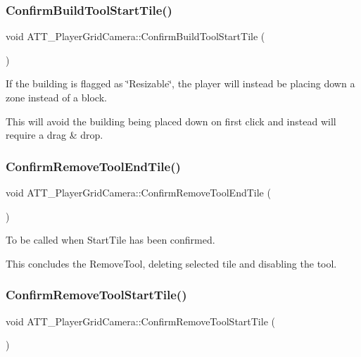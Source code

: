 \subsubsection{\texorpdfstring{ConfirmBuildToolStartTile()}{ConfirmBuildToolStartTile()}}
{\footnotesize\ttfamily void A\+T\+T\+\_\+\+Player\+Grid\+Camera\+::\+Confirm\+Build\+Tool\+Start\+Tile (\begin{DoxyParamCaption}{ }\end{DoxyParamCaption})\hspace{0.3cm}{\ttfamily [protected]}}



If the building is flagged as \char`\"{}\+Resizable\char`\"{}, the player will instead be placing down a zone instead of a block. 

This will avoid the building being placed down on first click and instead will require a drag \& drop. \mbox{\label{class_a_t_t___player_grid_camera_a26a23b23a58d5bbeab3359dcbd359b3a}} 
\subsubsection{\texorpdfstring{ConfirmRemoveToolEndTile()}{ConfirmRemoveToolEndTile()}}
{\footnotesize\ttfamily void A\+T\+T\+\_\+\+Player\+Grid\+Camera\+::\+Confirm\+Remove\+Tool\+End\+Tile (\begin{DoxyParamCaption}{ }\end{DoxyParamCaption})\hspace{0.3cm}{\ttfamily [protected]}}



To be called when Start\+Tile has been confirmed. 

This concludes the Remove\+Tool, deleting selected tile and disabling the tool. \mbox{\label{class_a_t_t___player_grid_camera_aec01f397402202fb08dea3a659256baa}} 
\subsubsection{\texorpdfstring{ConfirmRemoveToolStartTile()}{ConfirmRemoveToolStartTile()}}
{\footnotesize\ttfamily void A\+T\+T\+\_\+\+Player\+Grid\+Camera\+::\+Confirm\+Remove\+Tool\+Start\+Tile (\begin{DoxyParamCaption}{ }\end{DoxyParamCaption})\hspace{0.3cm}{\ttfamily [protected]}}



